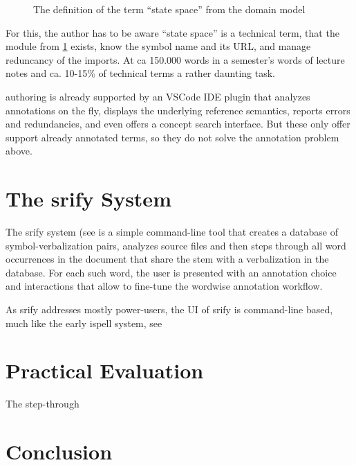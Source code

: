 \documentclass{llncs}
\newcommand\srf{\textsf{srify}\xspace}
\begin{document}
\begin{figure}[ht]\centering
  \caption{The definition of the term ``state space'' from the domain model}\label{fig:state-space}
\end{figure}

For this, the author has to be aware ``state space'' is a technical term, that the module
from \cref{fig:state-space} exists, know the symbol name and its URL, and manage
reduncancy of the imports. At ca 150.000 words in a semester's words of lecture notes and
ca. 10-15\% of technical terms a rather daunting task.

\sTeX authoring is already supported by an VSCode IDE plugin \cite{sTeX-IDE:git} that
analyzes annotations on the fly, displays the underlying reference semantics, reports
errors and redundancies, and even offers a concept search interface. But these only offer
support already annotated terms, so they do not solve the annotation problem above.

\section{The \srf System}

The \srf system (see \cite{stextools:git} is a simple command-line tool that creates a
database of symbol-verbalization pairs, analyzes \sTeX source
files and then steps through all word occurrences in the document that share the stem with
a verbalization in the database. For each such word, the user is presented with an
annotation choice and interactions that allow to fine-tune the wordwise annotation
workflow.

As \srf addresses mostly power-users, the UI of \srf is command-line based, much like the
early \textsf{ispell} system, see

\section{Practical Evaluation}

The step-through 

\section{Conclusion}
\end{document}
